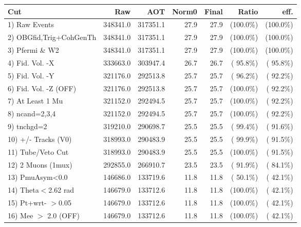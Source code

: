  \begin{table}[h!]\centering
 \begin{tabular}{||l||r|r|r|r|r|r||}
 \hline
 \hline
 Cut & Raw & AOT & Norm0 & Final & Ratio & eff.       \\
 \hline
  1) Raw Events           &     348341.0 &     317351.1 &         27.9 &         27.9 & (100.0\%) & (100.0\%) \\
  2) OBGfid,Trig+CohGenTh &     348341.0 &     317351.1 &         27.9 &         27.9 & (100.0\%) & (100.0\%) \\
  3) Pfermi \& W2         &     348341.0 &     317351.1 &         27.9 &         27.9 & (100.0\%) & (100.0\%) \\
  4) Fid. Vol. -X         &     333663.0 &     303947.4 &         26.7 &         26.7 & ( 95.8\%) & ( 95.8\%) \\
  5) Fid. Vol. -Y         &     321176.0 &     292513.8 &         25.7 &         25.7 & ( 96.2\%) & ( 92.2\%) \\
  6) Fid. Vol. -Z (OFF)   &     321176.0 &     292513.8 &         25.7 &         25.7 & (100.0\%) & ( 92.2\%) \\
  7) At Least 1 Mu        &     321152.0 &     292494.5 &         25.7 &         25.7 & (100.0\%) & ( 92.2\%) \\
  8) ncand=2,3,4          &     321152.0 &     292494.5 &         25.7 &         25.7 & (100.0\%) & ( 92.2\%) \\
  9) tnchgd=2             &     319210.0 &     290698.7 &         25.5 &         25.5 & ( 99.4\%) & ( 91.6\%) \\
 10) +/- Tracks (V0)      &     318993.0 &     290483.9 &         25.5 &         25.5 & ( 99.9\%) & ( 91.5\%) \\
 11) Tube/Veto Cut        &     318993.0 &     290483.9 &         25.5 &         25.5 & (100.0\%) & ( 91.5\%) \\
 12) 2 Muons (1mux)       &     292855.0 &     266910.7 &         23.5 &         23.5 & ( 91.9\%) & ( 84.1\%) \\
 13) PmuAsym<0.0          &     146686.0 &     133719.6 &         11.8 &         11.8 & ( 50.1\%) & ( 42.1\%) \\
 14) Theta$<$2.62 rad     &     146679.0 &     133712.6 &         11.8 &         11.8 & (100.0\%) & ( 42.1\%) \\
 15) Pt+wrt- $>$0.05      &     146679.0 &     133712.6 &         11.8 &         11.8 & (100.0\%) & ( 42.1\%) \\
 16) Mee $>$ 2.0  (OFF)   &     146679.0 &     133712.6 &         11.8 &         11.8 & (100.0\%) & ( 42.1\%) \\

\end{tabular}
\end{table}
